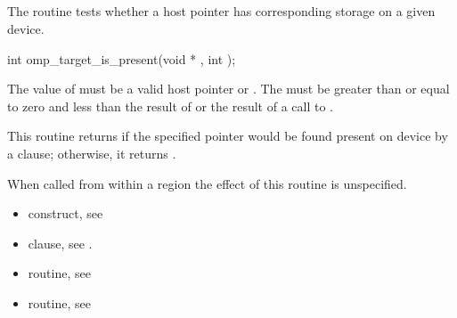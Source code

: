 \pagebreak
{}
\subsection{}
\label{subsec:omp_target_is_present}
\summary

The  routine tests whether a host pointer
has corresponding storage on a given device.

\format
\begin{boxedcode}
int omp\_target\_is\_present(void * , int );
\end{boxedcode}

\constraints

The value of  must be a valid host pointer or .
The 
must be greater than or equal to zero and less than the result of
 or the result of a call to
.

\effect

This routine returns  if the specified pointer
would be found present on device  by a 
clause; otherwise, it returns .

When called from within a  region 
the effect of this routine is unspecified.

\crossreferences
\begin{itemize}
\item {} construct, see 

\item {} clause, see .

\item {} routine, see 

\item {} routine, see 
\end{itemize}


\pagebreak
{}
\subsection{}
\label{subsec:omp_target_memcpy}
\summary

